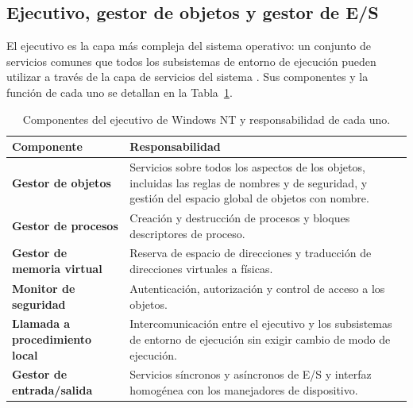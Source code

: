 \documentclass[12pt]{article}
\begin{document}
\subsection{Ejecutivo, gestor de objetos y gestor de E/S}
\label{sec:ejecutivoWindowsNt}

El ejecutivo es la capa más compleja del sistema operativo: un conjunto de servicios comunes que todos los subsistemas de entorno de ejecución pueden utilizar a través de la capa de servicios del sistema \parencite[\S 12.5, p.\ 624]{carretero2001sistemas}. Sus componentes y la función de cada uno se detallan en la Tabla~\ref{tab:componentesEjecutivo}.

\begin{table}[H]
\centering
\small
\renewcommand{\arraystretch}{1.15}
\renewcommand{\tabularxcolumn}[1]{m{#1}}
\setlength{\emergencystretch}{1.5em}
\caption{Componentes del ejecutivo de Windows NT y responsabilidad de cada uno.}
\label{tab:componentesEjecutivo}
\begin{tabularx}{\textwidth}{>{\centering\arraybackslash}m{4.6cm} X}
\toprule
\textbf{Componente} & \textbf{Responsabilidad} \\
\midrule
\textbf{Gestor de objetos} & Servicios sobre todos los aspectos de los objetos, incluidas las reglas de nombres y de seguridad, y gestión del espacio global de objetos con nombre. \\
\addlinespace
\textbf{Gestor de procesos} & Creación y destrucción de procesos y bloques descriptores de proceso. \\
\addlinespace
\textbf{Gestor de memoria virtual} & Reserva de espacio de direcciones y traducción de direcciones virtuales a físicas. \\
\addlinespace
\textbf{Monitor de seguridad} & Autenticación, autorización y control de acceso a los objetos. \\
\addlinespace
\textbf{Llamada a procedimiento local} & Intercomunicación entre el ejecutivo y los subsistemas de entorno de ejecución sin exigir cambio de modo de ejecución. \\
\addlinespace
\textbf{Gestor de entrada/salida} & Servicios síncronos y asíncronos de E/S y interfaz homogénea con los manejadores de dispositivo. \\
\bottomrule
\end{tabularx}
\end{table}
\end{document}
